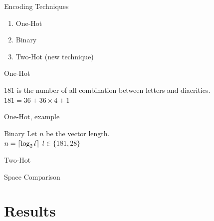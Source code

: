 \documentclass[10pt]{beamer}
\DeclarePairedDelimiter{\ceil}{\lceil}{\rceil}
\begin{document}
\begin{frame}[fragile]{Encoding Techniques}
\begin{enumerate}
    \item One-Hot
    \item Binary
    \item \alert{Two-Hot} (new technique)

\end{enumerate}
\end{frame}

\begin{frame}[fragile]{One-Hot}
    \begin{center}
        
    \end{center}
181 is the number of all combination between letters and diacritics.\\
$181 = 36 + 36 \times 4 + 1$
\end{frame}

\begin{frame}[fragile]{One-Hot, example}
    \begin{center}
        
    \end{center}
\end{frame}

\begin{frame}[fragile]{Binary}
Let $n$ be the vector length.\\
$n = \ceil*{\log_2 l}$ $l \in \{181, 28\}$
    \begin{center}
        
    \end{center}
\end{frame}

\begin{frame}[fragile]{Two-Hot}
    \begin{center}
        
    \end{center}
\end{frame}



\begin{frame}[fragile]{Space Comparison}
    \begin{center}
        
    \end{center}
\end{frame}








\section{Results}  
\end{document}
